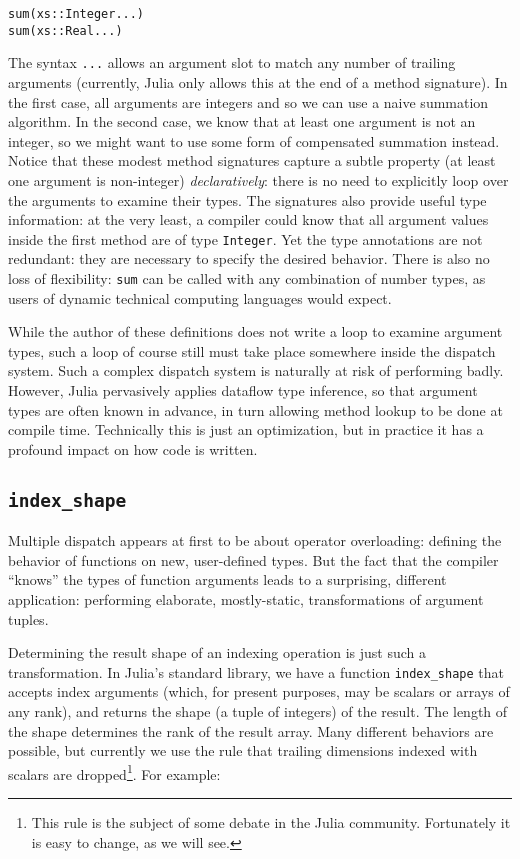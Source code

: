 \documentclass[preprint]{sigplanconf}
\newcommand{\code}[1]{\texttt{#1}}
\begin{document}
\begin{verbatim}
sum(xs::Integer...)
sum(xs::Real...)
\end{verbatim}

The syntax \code{...} allows an argument slot to match any number of trailing
arguments (currently, Julia only allows this at the end of a method signature).
In the first case, all arguments are integers and so we can use a naive
summation algorithm. In the second case, we know that at least one argument
is not an integer, so we might want to use some form of compensated
summation instead. Notice that these modest method signatures
capture a subtle property (at least one argument is non-integer)
\emph{declaratively}: there is no need to explicitly loop over the arguments
to examine their types. The signatures also provide useful type information:
at the very least, a compiler could know that all argument values inside
the first method are of type \code{Integer}. Yet the type annotations
are not redundant: they are necessary to specify the desired behavior. There
is also no loss of flexibility: \code{sum} can be called with any combination
of number types, as users of dynamic technical computing languages would expect.

While the author of these definitions does not write a loop to examine
argument types, such a loop of course still must take place somewhere inside
the dispatch system. Such a complex dispatch system is naturally at risk of
performing badly. However, Julia pervasively applies dataflow type
inference, so that argument types are often known in advance, in turn
allowing method lookup to be done at compile time. Technically this is
just an optimization, but in practice it has a profound impact on how code
is written.

\subsection{\code{index\_shape}}

Multiple dispatch appears at first to be about operator overloading:
defining the behavior of functions on new, user-defined types.
But the fact that the compiler ``knows'' the types of function arguments leads
to a surprising, different application: performing elaborate, mostly-static,
transformations of argument tuples.

Determining the result shape of an indexing operation is just such a
transformation. In Julia's standard library, we have a function
\code{index\_shape} that accepts index arguments (which, for present
purposes, may be scalars or arrays of any rank), and returns the
shape (a tuple of integers) of the result. The length of the shape
determines the rank of the result array. Many different behaviors
are possible, but currently we use the rule that trailing dimensions
indexed with scalars are dropped\footnote{This rule is the subject of
some debate in the Julia community. Fortunately it is easy to change,
as we will see.}.
For example:
\end{document}
